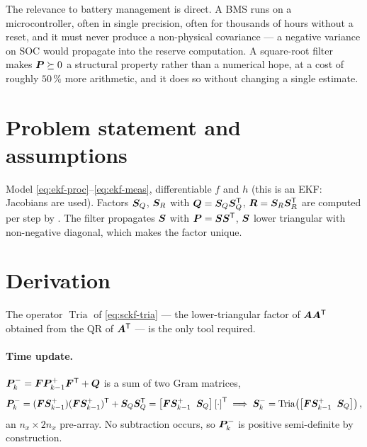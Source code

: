 The relevance to battery management is direct. A BMS runs on a microcontroller, often in
single precision, often for thousands of hours without a reset, and it must never produce a
non-physical covariance --- a negative variance on SOC would propagate into the reserve
computation. A square-root filter makes $\bm{P}\succeq0$ a structural property rather than a
numerical hope, at a cost of roughly $50\,\%$ more arithmetic, and it does so without
changing a single estimate.

\section{Problem statement and assumptions}
Model \eqref{eq:ekf-proc}--\eqref{eq:ekf-meas}, differentiable $f$ and $h$ (this is an EKF:
Jacobians are used). Factors $\bm{S}_Q$, $\bm{S}_R$ with $\bm{Q}=\bm{S}_Q\bm{S}_Q^{\mathsf{T}}$, $\bm{R}=\bm{S}_R\bm{S}_R^{\mathsf{T}}$
are computed per step by . The filter propagates $\bm{S}$ with
$\bm{P}=\bm{S}\bm{S}^{\mathsf{T}}$, $\bm{S}$ lower triangular with non-negative diagonal, which makes the factor
unique.

\section{Derivation}
The operator $\operatorname{Tria}$ of \eqref{eq:sckf-tria} --- the lower-triangular factor of
$\bm{A}\bm{A}^{\mathsf{T}}$ obtained from the QR of $\bm{A}^{\mathsf{T}}$ --- is the only tool required.

\paragraph{Time update.} $\bm{P}^{-}_k = \bm{F}\bm{P}^{+}_{k-1}\bm{F}^{\mathsf{T}} + \bm{Q}$ is a sum of two
Gram matrices,
\begin{equation}
\bm{P}^{-}_k = (\bm{F}\bm{S}^+_{k-1})(\bm{F}\bm{S}^+_{k-1})^{\mathsf{T}} + \bm{S}_Q\bm{S}_Q^{\mathsf{T}}
 = \left[\bm{F}\bm{S}^+_{k-1}\;\;\bm{S}_Q\right]\left[\cdot\right]^{\mathsf{T}}
 \;\Longrightarrow\;
 \bm{S}^-_k = \operatorname{Tria}\!\left(\left[\bm{F}\bm{S}^+_{k-1}\;\;\bm{S}_Q\right]\right),
\label{eq:srekf-tu}
\end{equation}
an $n_x\times 2n_x$ pre-array. No subtraction occurs, so $\bm{P}^{-}_k$ is positive
semi-definite by construction.

